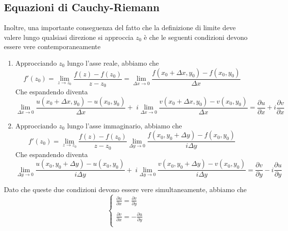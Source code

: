    \subsection{Equazioni di Cauchy-Riemann}
            Inoltre, una importante conseguenza del fatto che la definizione di limite deve valere lungo qualsiasi direzione si approccia $z_{0}$ è che le seguenti condizioni devono essere vere contemporaneamente
            \begin{enumerate}
                \item Approcciando $z_{0}$ lungo l'asse reale, abbiamo che
                \[
                    f'(z_{0}) = \lim_{z \rightarrow z_{0}} \frac{f(z) - f(z_{0})}{z - z_{0}} = \lim_{\Delta x \rightarrow 0} \frac{f(x_{0} + \Delta x, y_{0}) - f(x_{0}, y_{0})}{\Delta x}
                \]
                Che espandendo diventa
                \[
                    \lim_{\Delta x \rightarrow 0} \frac{u(x_{0} + \Delta x, y_{0}) - u(x_{0}, y_{0})}{\Delta x} + \; i \lim_{\Delta x \rightarrow 0} \frac{v(x_{0} + \Delta x, y_{0}) - v(x_{0}, y_{0})}{\Delta x} = \frac{\partial u}{\partial x} + i \frac{\partial v}{\partial x}
                \]

                \item Approcciando $z_{0}$ lungo l'asse immaginario, abbiamo che
                \[
                    f'(z_{0}) = \lim_{z \rightarrow z_{0}} \frac{f(z) - f(z_{0})}{z - z_{0}} \lim_{\Delta y \rightarrow 0} \frac{f(x_{0}, y_{0} + \Delta y) - f(x_{0}, y_{0})}{i \Delta y}
                \]
                Che espandendo diventa
                \[
                    \lim_{\Delta y \rightarrow 0} \frac{u(x_{0}, y_{0} + \Delta y) - u(x_{0}, y_{0})}{i \Delta y} + \; i \lim_{\Delta y \rightarrow 0} \frac{v(x_{0}, y_{0} + \Delta y) - v(x_{0}, y_{0})}{i \Delta y} = \frac{\partial v}{\partial y} - i \frac{\partial u}{\partial y}
                \]
            \end{enumerate}

            Dato che queste due condizioni devono essere vere simultaneamente, abbiamo che
            \[
                \begin{cases}
                    \displaystyle \frac{\partial u}{\partial x} = \frac{\partial v}{\partial y} \\
                    \\
                    \displaystyle \frac{\partial v}{\partial x} = -\frac{\partial u}{\partial y} \\
                \end{cases}
            \]

